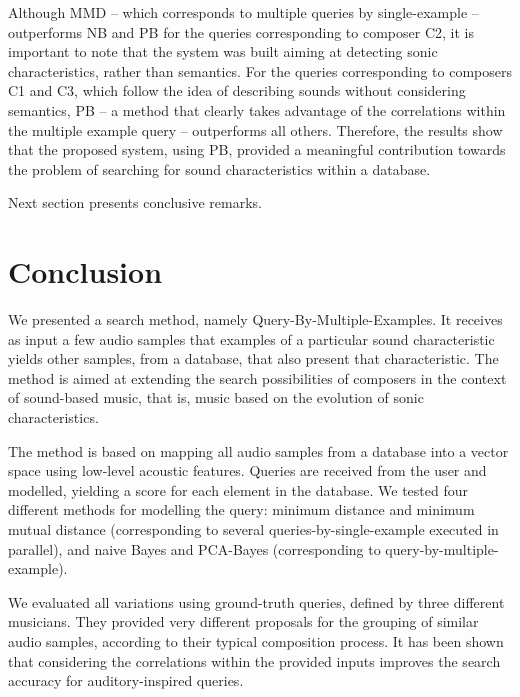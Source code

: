 \documentclass{article}
\begin{document}
Although MMD -- which corresponds to multiple
queries by single-example -- outperforms NB and PB for the queries
corresponding to composer C2, it is important to note that the system
was built aiming at detecting sonic characteristics, rather than
semantics. For the queries corresponding to composers C1 and C3, which
follow the idea of describing sounds without considering semantics,
PB -- a method that clearly takes advantage of the correlations within
the multiple example query -- outperforms all others. Therefore, the
results show that the proposed system, using PB, provided a meaningful
contribution towards the problem of searching for sound
characteristics within a database.

Next section presents conclusive remarks.

\section{Conclusion}\label{sec:conclusion}
We presented a search method, namely Query-By-Multiple-Examples. It 
receives as input a few audio samples that examples of a particular
sound characteristic yields other samples, from a database, that also
present that characteristic. The method is aimed at extending the
search possibilities of composers in the context of
sound-based music, that is, music based on the evolution of sonic
characteristics.

The method is based on mapping all audio samples from a database into
a vector space using low-level acoustic features. Queries are received
from the user and modelled, yielding a score for each element in the
database. We tested four different methods for modelling the query:
minimum distance and minimum mutual distance (corresponding to several
queries-by-single-example executed in parallel), and naive Bayes and
PCA-Bayes (corresponding to query-by-multiple-example).

We evaluated all variations using ground-truth queries, defined by
three different musicians. They provided very different
proposals for the grouping of similar audio samples, according to
their typical composition process. It has been shown that considering
the correlations within the provided inputs improves the search
accuracy for auditory-inspired queries.

\end{document}
